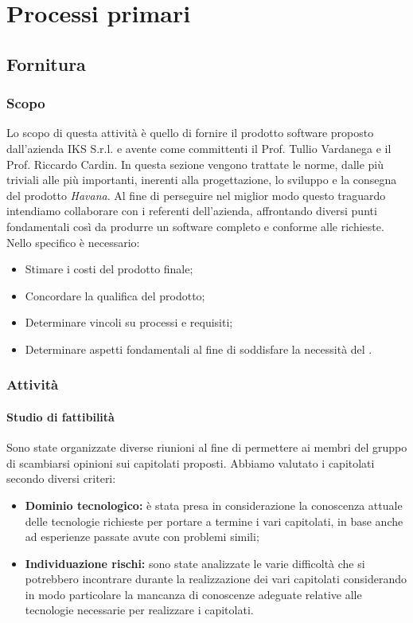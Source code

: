 	\section{Processi primari}

\subsection{Fornitura}
	
	\subsubsection{Scopo}
	Lo scopo di questa attività è quello di fornire il prodotto software proposto dall'azienda IKS S.r.l. e avente come committenti il Prof. Tullio Vardanega e il Prof. Riccardo Cardin.
	In questa sezione vengono trattate le norme, dalle più triviali alle più importanti, inerenti alla progettazione, lo sviluppo e la consegna del prodotto \emph{Havana}.
	Al fine di perseguire nel miglior modo questo traguardo intendiamo collaborare con i referenti dell'azienda, affrontando diversi punti fondamentali così da produrre un software completo e conforme alle richieste. Nello specifico è necessario:
    \begin{itemize}
	\item Stimare i costi del prodotto finale;
	\item Concordare la qualifica del prodotto;
	\item Determinare vincoli su processi e requisiti;
	\item Determinare aspetti fondamentali al fine di soddisfare la necessità del .
	\end{itemize}
	\subsubsection{Attività} 
		\paragraph{Studio di fattibilità} \Spazio
		Sono state organizzate diverse riunioni al fine di permettere ai membri del gruppo di scambiarsi opinioni sui capitolati proposti. 
		Abbiamo valutato i capitolati secondo diversi criteri:
		\begin{itemize}
			\item \textbf{Dominio tecnologico:} è stata presa in considerazione la conoscenza attuale delle tecnologie richieste per portare a termine i vari capitolati, in base anche ad esperienze passate avute con problemi simili;
			\item \textbf{Individuazione rischi:} sono state analizzate le varie difficoltà che si potrebbero incontrare durante la realizzazione dei vari capitolati considerando in modo particolare la mancanza di conoscenze adeguate relative alle tecnologie necessarie per realizzare i capitolati.
		\end{itemize}  \textit{}
	
